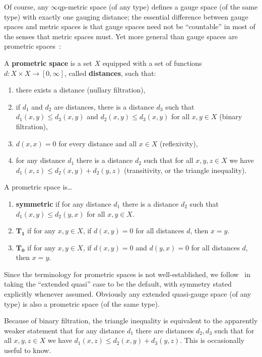 \documentclass{article}
\def\Rp{[0,\infty]}
\def\eqp{$\infty$qp}
\begin{document}
Of course, any \eqp-metric space (of any type) defines a gauge space (of the same type) with exactly one gauging distance; the essential difference between gauge spaces and metric spaces is that gauge spaces need not be ``countable'' in most of the senses that metric spaces must.
Yet more general than gauge spaces are prometric spaces~\cite{cht:one-setting}:

\begin{defn}
  A \textbf{prometric space} is a set $X$ equipped with a set of functions $d:X\times X\to\Rp$, called \textbf{distances}, such that:
  \begin{enumerate}
  \item there exists a distance (nullary filtration),
  \item if $d_1$ and $d_2$ are distances, there is a distance $d_3$ such that $d_1(x,y)\le d_3(x,y)$ and $d_2(x,y)\le d_3(x,y)$ for all $x,y\in X$ (binary filtration),
  \item $d(x,x)=0$ for every distance and all $x\in X$ (reflexivity),
  \item for any distance $d_1$ there is a distance $d_2$ such that for all $x,y,z\in X$ we have $d_1(x,z)\le d_2(x,y)+d_2(y,z)$ (transitivity, or the triangle inequality).
  \end{enumerate}
  A prometric space is\dots
  \begin{enumerate}[resume]
  \item \textbf{symmetric} if for any distance $d_1$ there is a distance $d_2$ such that $d_1(x,y)\le d_2(y,x)$ for all $x,y\in X$.
  \item $\mathbf{T_1}$ if for any $x,y\in X$, if $d(x,y)=0$ for all distances $d$, then $x=y$.
  \item $\mathbf{T_0}$ if for any $x,y\in X$, if $d(x,y)=0$ and $d(y,x)=0$ for all distances $d$, then $x=y$.
  \end{enumerate}
\end{defn}

Since the terminology for prometric spaces is not well-established, we follow~\cite{cht:one-setting} in taking the ``extended quasi'' case to be the default, with symmetry stated explicitly whenever assumed.
Obviously any extended quasi-gauge space (of any type) is also a prometric space (of the same type).

\begin{rmk}
  Because of binary filtration, the triangle inequality is equivalent to the apparently weaker statement that for any distance $d_1$ there are distances $d_2,d_3$ such that for all $x,y,z\in X$ we have $d_1(x,z)\le d_2(x,y)+d_3(y,z)$.
  This is occasionally useful to know.
\end{rmk}
\end{document}
